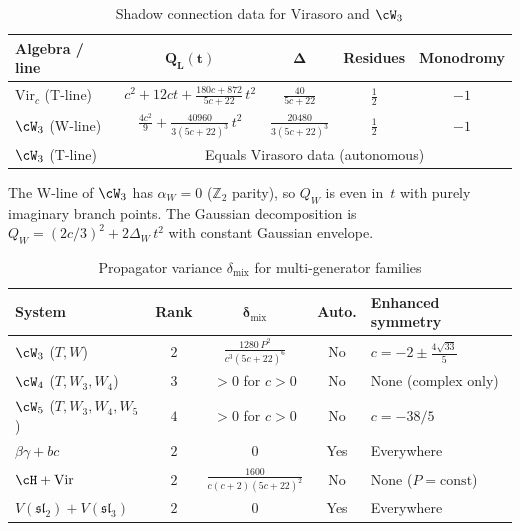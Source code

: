 \begin{table}[ht]
\centering
\caption{Shadow connection data for Virasoro and $\cW_3$}
\label{tab:shadow-connection-census}
\renewcommand{\arraystretch}{1.3}
{\small
\begin{tabular}{|l|c|c|c|c|}
\hline
\textbf{Algebra / line}
 & $\boldsymbol{Q_L(t)}$
 & $\boldsymbol{\Delta}$
 & \textbf{Residues}
 & \textbf{Monodromy} \\
\hline
$\mathrm{Vir}_c$ (T-line)
 & $c^2 + 12ct + \frac{180c{+}872}{5c{+}22}\,t^2$
 & $\frac{40}{5c{+}22}$
 & $\frac{1}{2}$
 & $-1$ \\
\hline
$\cW_3$ (W-line)
 & $\frac{4c^2}{9} + \frac{40960}{3(5c{+}22)^3}\,t^2$
 & $\frac{20480}{3(5c{+}22)^3}$
 & $\frac{1}{2}$
 & $-1$ \\
\hline
$\cW_3$ (T-line)
 & \multicolumn{4}{c|}{Equals Virasoro data (autonomous)} \\
\hline
\end{tabular}
}%
\end{table}

\noindent
The W-line of $\cW_3$ has $\alpha_W = 0$ ($\mathbb{Z}_2$ parity),
so $Q_W$ is even in~$t$ with purely imaginary branch points.
The Gaussian decomposition is $Q_W = (2c/3)^2 + 2\Delta_W\,t^2$
with constant Gaussian envelope.

\begin{table}[ht]
\centering
\caption{Propagator variance $\delta_{\mathrm{mix}}$ for
 multi-generator families}
\label{tab:propagator-variance-census}
\renewcommand{\arraystretch}{1.3}
{\small
\begin{tabular}{|l|c|c|c|l|}
\hline
\textbf{System}
 & \textbf{Rank}
 & $\boldsymbol{\delta_{\mathrm{mix}}}$
 & \textbf{Auto.}
 & \textbf{Enhanced symmetry} \\
\hline
$\cW_3$ ($T, W$)
 & $2$
 & $\frac{1280\,P^2}{c^3(5c{+}22)^6}$
 & No
 & $c = -2 \pm \tfrac{4\sqrt{33}}{5}$ \\[4pt]
\hline
$\cW_4$ ($T, W_3, W_4$)
 & $3$
 & $> 0$ for $c > 0$
 & No
 & None (complex only) \\
\hline
$\cW_5$ ($T, W_3, W_4, W_5$)
 & $4$
 & $> 0$ for $c > 0$
 & No
 & $c = -38/5$ \\
\hline
$\beta\gamma + bc$
 & $2$
 & $0$
 & Yes
 & Everywhere \\
\hline
$\cH + \mathrm{Vir}$
 & $2$
 & $\frac{1600}{c(c{+}2)(5c{+}22)^2}$
 & No
 & None ($P = \mathrm{const}$) \\[4pt]
\hline
$V(\mathfrak{sl}_2) + V(\mathfrak{sl}_3)$
 & $2$
 & $0$
 & Yes
 & Everywhere \\
\hline
\end{tabular}
}%
\end{table}

